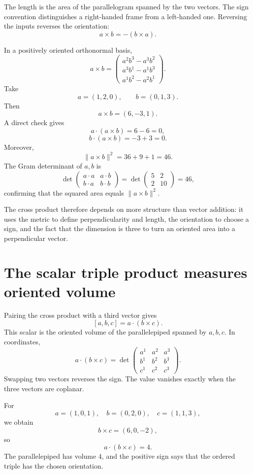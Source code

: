 The length is the area of the parallelogram spanned by the two vectors.  The sign convention distinguishes a right-handed frame from a left-handed one.  Reversing the inputs reverses the orientation:
\[
  a\times b=-(b\times a).
\]

In a positively oriented orthonormal basis,
\[
  a\times b=
  \begin{pmatrix}
    a^2b^3-a^3b^2\\
    a^3b^1-a^1b^3\\
    a^1b^2-a^2b^1
  \end{pmatrix}.
\]
Take
\[
  a=(1,2,0),
  \qquad
  b=(0,1,3).
\]
Then
\[
  a\times b=(6,-3,1).
\]
A direct check gives
\[
  a\cdot(a\times b)=6-6=0,
\]
\[
  b\cdot(a\times b)=-3+3=0.
\]
Moreover,
\[
  \|a\times b\|^2=36+9+1=46.
\]
The Gram determinant of \(a,b\) is
\[
  \det
  \begin{pmatrix}
    a\cdot a&a\cdot b\\
    b\cdot a&b\cdot b
  \end{pmatrix}
  =
  \det
  \begin{pmatrix}
    5&2\\
    2&10
  \end{pmatrix}
  =46,
\]
confirming that the squared area equals \(\|a\times b\|^2\).

The cross product therefore depends on more structure than vector addition: it uses the metric to define perpendicularity and length, the orientation to choose a sign, and the fact that the dimension is three to turn an oriented area into a perpendicular vector.

\section{The scalar triple product measures oriented volume}

Pairing the cross product with a third vector gives
\[
  [a,b,c]=a\cdot(b\times c).
\]
This scalar is the oriented volume of the parallelepiped spanned by \(a,b,c\).  In coordinates,
\[
  a\cdot(b\times c)
  =
  \det
  \begin{pmatrix}
    a^1&a^2&a^3\\
    b^1&b^2&b^3\\
    c^1&c^2&c^3
  \end{pmatrix}.
\]
Swapping two vectors reverses the sign.  The value vanishes exactly when the three vectors are coplanar.

For
\[
  a=(1,0,1),
  \quad
  b=(0,2,0),
  \quad
  c=(1,1,3),
\]
we obtain
\[
  b\times c=(6,0,-2),
\]
so
\[
  a\cdot(b\times c)=4.
\]
The parallelepiped has volume \(4\), and the positive sign says that the ordered triple has the chosen orientation.

